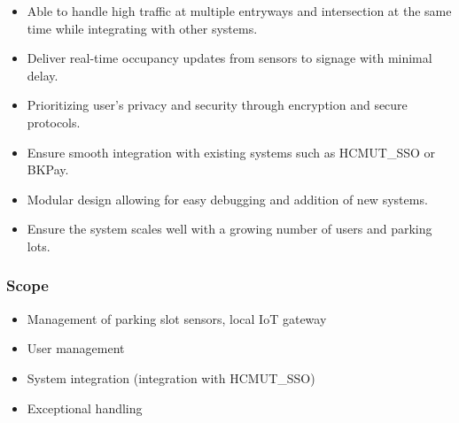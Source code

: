 \begin{itemize}
\begin{itemize}
        \item Able to handle high traffic at multiple entryways and intersection at the same time while integrating with other systems.
        \item Deliver real-time occupancy updates from sensors to signage with minimal delay.
        \item Prioritizing user's privacy and security through encryption and secure protocols.
        \item Ensure smooth integration with existing systems such as HCMUT\_SSO or BKPay.
        \item Modular design allowing for easy debugging and addition of new systems.
        \item Ensure the system scales well with a growing number of users and parking lots.
    \end{itemize}
\end{itemize}
\subsubsection{Scope}
\begin{itemize}
    \item Management of parking slot sensors, local IoT gateway
    \item User management
    \item System integration (integration with HCMUT\_SSO)
    \item Exceptional handling
\end{itemize}
